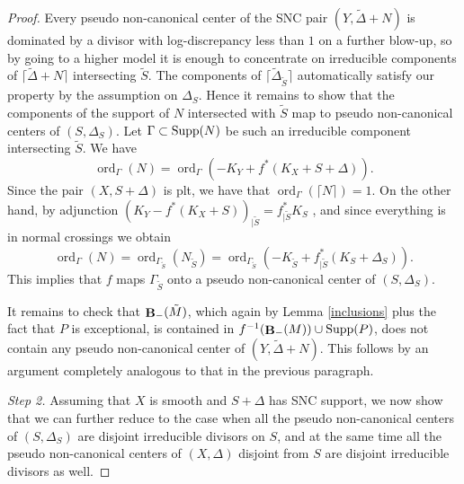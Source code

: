 \documentclass[11pt]{amsart}
\theoremstyle{plain}
\theoremstyle{definition}
\DeclareMathOperator{\ord}{ord}
\DeclareMathOperator{\BB}{{\bf B}}
\begin{document}
\begin{proof}
Every pseudo non-canonical center of the SNC pair $(Y, \tilde \Delta + N)$ is dominated by a divisor with log-discrepancy less than $1$ on a further blow-up, so by going to a higher model it is enough to concentrate on irreducible components of 
$\lceil \tilde \Delta + N \rceil$ intersecting $\tilde S$. The components of $\lceil \tilde \Delta_{\tilde S} \rceil$ automatically satisfy our property 
by the assumption on $\Delta_S$. Hence it remains to show that the components of the support of $N$ intersected with $\tilde S$ map to pseudo non-canonical centers of  $(S, \Delta_S)$. Let $\Gamma \subset {\rm Supp}(N)$ be such an irreducible component intersecting $\tilde S$. We have  
$$\ord_{\Gamma}(N) = \ord_{\Gamma} (- K_Y + f^* (K_X + S+ \Delta)).$$
Since the pair $(X, S+ \Delta)$ is plt, we have that $\ord_{\Gamma}(\lceil N\rceil) = 1$.
On the other hand, by adjunction $ (K_Y - f^* (K_X + S))_{|\tilde S} = f_{|\tilde S}^* K_S$ , and since everything is in normal crossings we obtain 
$$\ord_{\Gamma} (N) = \ord_{\Gamma_{\tilde S}}(N_{\tilde S}) = \ord_{\Gamma_{\tilde S}} (- K_{\tilde S} + f_{|\tilde S}^* (K_S + \Delta_S)).$$
This implies that $f$ maps $\Gamma_{\tilde S}$ onto a pseudo non-canonical center of $(S, \Delta_S)$.

It remains to check that $\BB_{-} (\tilde M)$, which again by Lemma \ref{inclusions} plus the fact that 
$P$ is exceptional, is contained in $f^{-1} (\BB_{-} (M)) \cup {\rm Supp} (P)$, does not 
contain any pseudo non-canonical center of $(Y, {\tilde \Delta} + N)$. This follows by an argument completely analogous to that in the previous paragraph.



\noindent
\emph{Step 2.}
Assuming that $X$ is smooth and $S+ \Delta$ has SNC support, 
we now show that we can further reduce to the case when all the pseudo non-canonical centers of $(S, \Delta_S)$ 
are disjoint irreducible divisors on $S$, and at the same time 
all the pseudo non-canonical centers of $(X, \Delta)$ disjoint from $S$ are disjoint irreducible divisors as well.


\end{proof}
\end{document}
